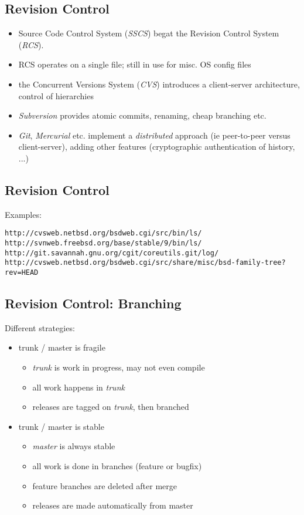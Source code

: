 \documentclass[xga]{xdvislides}
\begin{document}
\subsection{Revision Control}
\begin{itemize}
	\item Source Code Control System ({\em SSCS}) begat the Revision
		Control System ({\em RCS}).
	\item RCS operates on a single file; still in use for misc. OS
		config files
	\item the Concurrent Versions System ({\em CVS}) introduces a
		client-server architecture, control of hierarchies
	\item {\em Subversion} provides atomic commits, renaming, cheap
		branching etc.
	\item {\em Git}, {\em Mercurial} etc. implement a {\em
		distributed} approach (ie peer-to-peer versus
		client-server), adding other features (cryptographic
		authentication of history, ...)
\end{itemize}

\subsection{Revision Control}
Examples:

{\tt http://cvsweb.netbsd.org/bsdweb.cgi/src/bin/ls/} \\

{\tt http://svnweb.freebsd.org/base/stable/9/bin/ls/} \\

{\tt http://git.savannah.gnu.org/cgit/coreutils.git/log/} \\

{\tt http://cvsweb.netbsd.org/bsdweb.cgi/src/share/misc/bsd-family-tree?rev=HEAD}

\subsection{Revision Control: Branching}
Different strategies:
\begin{itemize}
	\item trunk / master is fragile
		\begin{itemize}
			\item {\em trunk} is work in progress, may not even compile
			\item all work happens in {\em trunk}
			\item releases are tagged on {\em trunk}, then branched
		\end{itemize}
	\item trunk / master is stable
		\begin{itemize}
			\item {\em master} is always stable
			\item all work is done in branches (feature or bugfix)
			\item feature branches are deleted after merge
			\item releases are made automatically from master
		\end{itemize}
\end{itemize}
\end{document}
